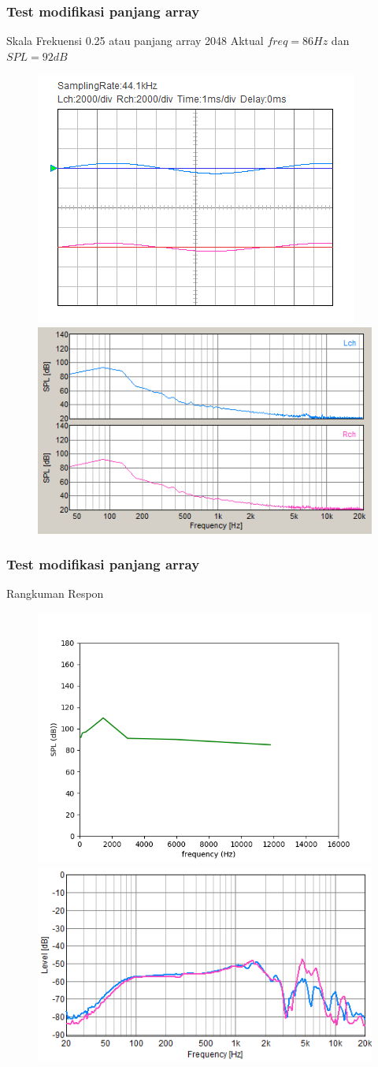 \documentclass[table,dvipsnames,10pt]{beamer}
\begin{document}
	\begin{frame}[fragile]
	\frametitle{Test modifikasi panjang array}
	\begin{exampleblock}{Skala Frekuensi 0.25 atau panjang array 2048}
		Aktual $freq = 86 Hz$ dan $SPL = 92 dB$
		\begin{figure}[H]
			\centering
			\includegraphics[width=0.4\linewidth]{result/day_4/osi_sine0p25}
			\includegraphics[width=0.45\linewidth]{result/day_4/fft_sine0p25}
		\end{figure}
	\end{exampleblock}
	\end{frame}

	\begin{frame}[fragile]
	\frametitle{Test modifikasi panjang array}
	\begin{exampleblock}{Rangkuman Respon}
		\begin{figure}[H]
			\centering
			\includegraphics[width=0.45\linewidth]{result/analisa/freq_spl}
			\includegraphics[width=0.45\linewidth]{result/day_1/FreqResp_JBL}
		\end{figure}
	\end{exampleblock}
	\end{frame}
\end{document}
